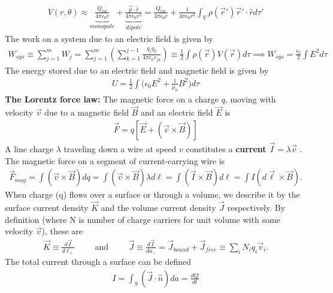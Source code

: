 \begin{align}
	V(r,\theta) \approx \underbrace{\frac{Q_{tot}}{4\pi\epsilon_0 r}}_{monopole} + \underbrace{\frac{\vec{p} \cdot \hat{r}}{4\pi\epsilon_0 r^2}}_{dipole} = \frac{Q_{tot}}{4\pi\epsilon_0 r} + \frac{1}{4\pi\epsilon_0r^2}\int_V \rho(\vec{r}')\vec{r}'\cdot \hat{r} d\tau'
\end{align}
The work on a system due to an electric field is given by
\begin{align}
	W_{sys} \equiv \sum_{j=1}^{m} W_j= \sum_{j=1}^{m} \left(\sum_{k=1}^{j-1} \frac{q_jq_k}{4\pi\epsilon_0r_{jk}}\right) \equiv \frac{1}{2}\int \rho(\vec{r})V(\vec{r})d\tau \implies W_{sys}= \frac{\epsilon_0}{2}\int E^2 d\tau
\end{align}
The energy stored due to an electric field and magnetic field is given by
\begin{align}
	U= \frac{1}{2}\int \bigg(\epsilon_0E^2+\frac{1}{\mu_0}B^2\bigg) d\tau
\end{align}
\textbf{The Lorentz force law:} The magnetic force on a charge $q$, moving with velocity $\vec{v}$ due to a magnetic field $\vec{B}$ and an electric field $\vec{E}$ is
\begin{align}
	\vec{F} = q[\vec{E}+(\vec{v}\times \vec{B})]
\end{align}
A line charge $\lambda$ traveling down a wire at speed $v$ constitutes a \textbf{current} $\vec{I}=\lambda \vec{v}$ \cite{bib:Griffiths}. The magnetic force on a segment of current-carrying wire is
\begin{align}
	\vec{F}_{mag} = \int (\vec{v}\times \vec{B})dq = \int (\vec{v}\times \vec{B})\lambda d\ell = \int (\vec{I}\times \vec{B})d\ell = \int I (d\vec{\ell}\times \vec{B}).
\end{align} 
When charge (q) flows over a surface or through a volume, we describe it by the surface current density $\vec{K}$ and the volume current density $\vec{J}$ respectively. By definition (where N is number of charge carriers for unit volume with some velocity $\vec{v}$), these are
\begin{align}
	\vec{K} \equiv \frac{d\vec{I}}{d\ell_\perp} \hspace{1cm}\textrm{and}\hspace{1cm}\vec{J}\equiv \frac{d\vec{I}}{da_\perp} = \vec{J}_{bound}+\vec{J}_{free} \equiv \sum_{i}N_iq_i\vec{v}_i.
\end{align}
The total current through a surface can be defined
\begin{align}
	I = \int_S (\vec{J}\cdot \hat{n})da = \frac{dQ}{dt} 
\end{align}

